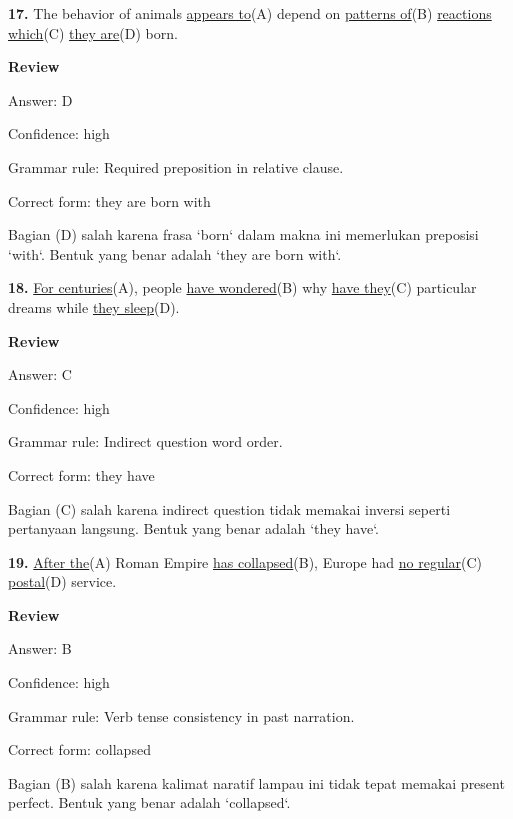 \documentclass[12pt]{article}
\begin{document}
\endgroup
\par
\vspace{\questionblockgap}
\noindent\textbf{17.} The behavior of animals \uline{appears to}(A) depend on \uline{patterns of}(B) \uline{reactions which}(C) \uline{they are}(D) born.
\par
\begingroup
\setlength{\parskip}{0pt}
\setlength{\parindent}{0pt}
\textbf{Review}\par
Answer: D\par
Confidence: high\par
Grammar rule: Required preposition in relative clause.\par
Correct form: they are born with\par
Bagian (D) salah karena frasa `born` dalam makna ini memerlukan preposisi `with`. Bentuk yang benar adalah `they are born with`.\par
\endgroup
\par
\vspace{\questionblockgap}
\noindent\textbf{18.} \uline{For centuries}(A), people \uline{have wondered}(B) why \uline{have they}(C) particular dreams while \uline{they sleep}(D).
\par
\begingroup
\setlength{\parskip}{0pt}
\setlength{\parindent}{0pt}
\textbf{Review}\par
Answer: C\par
Confidence: high\par
Grammar rule: Indirect question word order.\par
Correct form: they have\par
Bagian (C) salah karena indirect question tidak memakai inversi seperti pertanyaan langsung. Bentuk yang benar adalah `they have`.\par
\endgroup
\par
\vspace{\questionblockgap}
\noindent\textbf{19.} \uline{After the}(A) Roman Empire \uline{has collapsed}(B), Europe had \uline{no regular}(C) \uline{postal}(D) service.
\par
\begingroup
\setlength{\parskip}{0pt}
\setlength{\parindent}{0pt}
\textbf{Review}\par
Answer: B\par
Confidence: high\par
Grammar rule: Verb tense consistency in past narration.\par
Correct form: collapsed\par
Bagian (B) salah karena kalimat naratif lampau ini tidak tepat memakai present perfect. Bentuk yang benar adalah `collapsed`.\par
\end{document}
